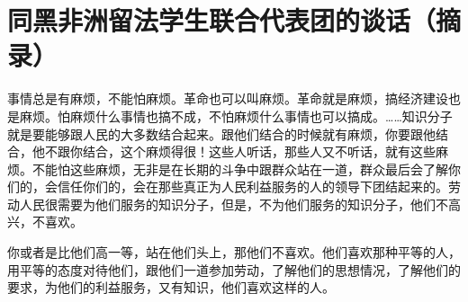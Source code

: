 \section[同黑非洲留法学生联合代表团的谈话（摘录）（一九六五年九月十四日）]{同黑非洲留法学生联合代表团的谈话（摘录）}


事情总是有麻烦，不能怕麻烦。革命也可以叫麻烦。革命就是麻烦，搞经济建设也是麻烦。怕麻烦什么事情也搞不成，不怕麻烦什么事情也可以搞成。……知识分子就是要能够跟人民的大多数结合起来。跟他们结合的时候就有麻烦，你要跟他结合，他不跟你结合，这个麻烦得很！这些人听话，那些人又不听话，就有这些麻烦。不能怕这些麻烦，无非是在长期的斗争中跟群众站在一道，群众最后会了解你们的，会信任你们的，会在那些真正为人民利益服务的人的领导下团结起来的。劳动人民很需要为他们服务的知识分子，但是，不为他们服务的知识分子，他们不高兴，不喜欢。

你或者是比他们高一等，站在他们头上，那他们不喜欢。他们喜欢那种平等的人，用平等的态度对待他们，跟他们一道参加劳动，了解他们的思想情况，了解他们的要求，为他们的利益服务，又有知识，他们喜欢这样的人。


